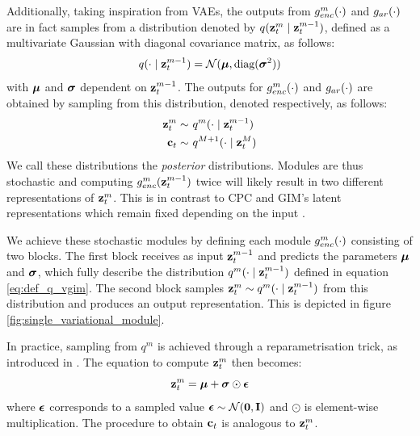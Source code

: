 			Additionally, taking inspiration from VAEs, the outputs from $g_{enc}^m(\cdot)$ and $g_{ar}(\cdot)$ are in fact samples from a distribution denoted by $q(\mathbf{z}_t^m \mid \mathbf{z}_t^{m-1})$, defined as a multivariate Gaussian with diagonal covariance matrix, as follows:
			\begin{equation}
				q(\cdot \mid \mathbf{z}_t^{m-1}) = \mathcal{N}(\bm{\mu}, \text{diag}(\bm{\sigma}^2)) \label{eq:def_q_vgim}
			\end{equation}
			with $\bm{\mu}$ and $\bm{\sigma}$ dependent on $\mathbf{z}_t^{m-1}$.
			The outputs for $g_{enc}^m(\cdot)$ and $g_{ar}(\cdot)$ are obtained by sampling from this distribution, denoted respectively, as follows:
 			\begin{align} %
			 	\sample{\zt^m}~ & \qfromzmneg  \label{eq:sample_z_from_q} \\
			 	\sample{\ct}~ & \qfromzM
			 \end{align}
			We call these distributions the \textit{posterior} distributions. Modules are thus stochastic and computing $g_{enc}^m(\mathbf{z}_t^{m-1})$ twice will likely result in two different representations of $\mathbf{z}_t^m$. This is in contrast to CPC and GIM's latent representations which remain fixed depending on the input \citep{oordRepresentationLearningContrastive2019, lowePuttingEndEndtoEnd2020a}.
		
			We achieve these stochastic modules by defining each module $g_{enc}^m(\cdot)$ consisting of two blocks. The first block receives as input $\mathbf{z}_t^{m-1}$ and predicts the parameters $\bm{\mu}$ and $\bm{\sigma}$, which fully describe the distribution $q^m(\cdot \mid \mathbf{z}_t^{m-1})$ defined in equation \ref{eq:def_q_vgim}. The second block samples $\mathbf{z}_t^m \sim q^m(\cdot \mid \mathbf{z}_t^{m-1})$ from this distribution and produces an output representation. This is depicted in figure \ref{fig:single_variational_module}.
			
			
			
			In practice, sampling from $q^m$ is achieved through a reparametrisation trick, as introduced in \citep{kingmaAutoEncodingVariationalBayes2022}. The equation to compute $\mathbf{z}_t^m$ then becomes:
			\begin{equation*}
				\mathbf{z}_t^m = \bm{\mu} + \bm{\sigma} \odot \bm{\epsilon}
			\end{equation*}
			where $\bm{\epsilon}$ corresponds to a sampled value $\bm{\epsilon} \sim \mathcal{N}(\bm{\mathbf{0}}, \mathbf{I})$ and $\odot$ is element-wise multiplication. The procedure to obtain $\mathbf{c}_t$ is analogous to $\mathbf{z}_t^m$.
			
